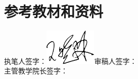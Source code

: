 \documentclass{swfusyllabus}
\begin{document}
\section{参考教材和资料}


\booklist{}

\vfill
\begin{flushright}
  执笔人签字：\includegraphics[width=25mm]{wangxiaolin}\qquad 审稿人签字：\makebox[2cm][c]{}\\
  主管教学院长签字：\makebox[2cm][c]{}
\end{flushright}
\end{document}
